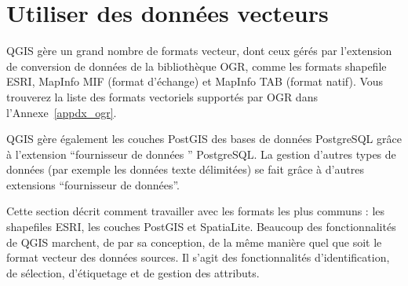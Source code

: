 \section{Utiliser des données vecteurs}\label{label_workingvector}



QGIS gère un grand nombre de formats vecteur, dont ceux gérés par l'extension de conversion de données de la bibliothèque OGR, comme les formats shapefile ESRI, MapInfo MIF (format d'échange) et  MapInfo TAB (format natif).
Vous trouverez la liste des formats vectoriels supportés par OGR dans l'Annexe~\ref{appdx_ogr}.

QGIS gère également les couches PostGIS des bases de données PostgreSQL grâce à l'extension ``fournisseur de données '' PostgreSQL. La gestion d'autres types de données (par exemple les données texte délimitées) se fait grâce à d'autres extensions ``fournisseur de données''.

Cette section décrit comment travailler avec les formats les plus communs : les shapefiles ESRI, les couches PostGIS et SpatiaLite. Beaucoup des fonctionnalités de QGIS marchent, de par sa conception, de la même manière quel que soit le format vecteur des données sources. Il s'agit des fonctionnalités d'identification, de sélection, d'étiquetage et de gestion des attributs.

